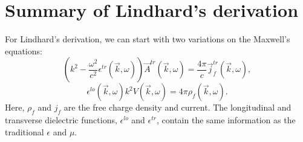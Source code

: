 \documentclass[../../main.tex]{subfiles}
\begin{document}
\section{Summary of Lindhard's derivation}

For Lindhard's derivation, we can start with two variations on the Maxwell's equations:
\begin{equation}
	\left(k^2 - \frac{\omega^2}{c^2} \epsilon^{tr}(\vec{k}, \omega) \right) \vec{A}^{tr}(\vec{k}, \omega) = \frac{4\pi}{c} \vec{j}^{tr}_{f}(\vec{k}, \omega),
\end{equation}
\begin{equation}
	\epsilon^{lo}(\vec{k}, \omega) k^2 V(\vec{k}, \omega) = 4 \pi \rho_f(\vec{k}, \omega).
\end{equation}
Here, $\rho_f$ and $j_f$ are the free charge density and current. The longitudinal and transverse dielectric functions, $\epsilon^{lo}$ and $\epsilon^{tr}$, contain the same information as the traditional $\epsilon$ and $\mu$.
\end{document}
